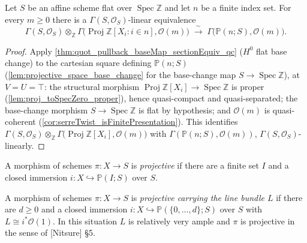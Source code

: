 \begin{theorem}\leanok
  \label{thm:serreTwist_sections_baseChange}
  Let \(S\) be an affine scheme flat over \(\operatorname{Spec}
  \mathbb{Z}\) and let \(n\) be a finite index set. For every \(m \ge
  0\) there is a \(\Gamma(S, \mathcal{O}_S)\)-linear equivalence
  \[
    \Gamma(S, \mathcal{O}_S) \otimes_{\mathbb{Z}}
      \Gamma\bigl(\operatorname{Proj} \mathbb{Z}[X_i : i \in n],
      \mathcal{O}(m)\bigr)
    \;\xrightarrow{\ \sim\ }\;
    \Gamma\bigl(\mathbb{P}(n; S), \mathcal{O}(m)\bigr).
  \]
\end{theorem}
\begin{proof}\leanok
  Apply \cref{thm:quot_pullback_baseMap_sectionEquiv_qc} (\(H^0\) flat
  base change) to the cartesian square defining \(\mathbb{P}(n; S)\)
  (\cref{lem:projective_space_base_change} for the base-change map
  \(S \to \operatorname{Spec} \mathbb{Z}\)), at \(V = U = \top\): the
  structural morphism
  \(\operatorname{Proj} \mathbb{Z}[X_i] \to \operatorname{Spec}
  \mathbb{Z}\) is proper (\cref{lem:proj_toSpecZero_proper}), hence
  quasi-compact and quasi-separated; the base-change morphism
  \(S \to \operatorname{Spec} \mathbb{Z}\) is flat by hypothesis; and
  \(\mathcal{O}(m)\) is quasi-coherent
  (\cref{cor:serreTwist_isFinitePresentation}). This identifies
  \(\Gamma(S, \mathcal{O}_S) \otimes_{\mathbb{Z}} \Gamma\bigl(
  \operatorname{Proj} \mathbb{Z}[X_i], \mathcal{O}(m)\bigr)\) with
  \(\Gamma(\mathbb{P}(n; S), \mathcal{O}(m))\), \(\Gamma(S,
  \mathcal{O}_S)\)-linearly.
\end{proof}

\begin{definition}
  \label{def:projective_morphism}
  \leanok
  A morphism of schemes \(\pi : X \to S\) is \emph{projective} if there are a
  finite set \(I\) and a closed immersion
  \(i : X \hookrightarrow \mathbb{P}(I;S)\) over \(S\).
\end{definition}

\begin{definition}
  \label{def:projective_with}
  \leanok
  A morphism of schemes \(\pi : X \to S\) is \emph{projective carrying the
  line bundle \(L\)} if there are \(d \ge 0\) and a closed immersion
  \(i : X \hookrightarrow \mathbb{P}(\{0,\dots,d\}; S)\) over \(S\) with
  \(L \cong i^* \mathcal{O}(1)\).  In this situation \(L\) is relatively
  very ample and \(\pi\) is projective in the sense of [Nitsure] \S 5.
\end{definition}

